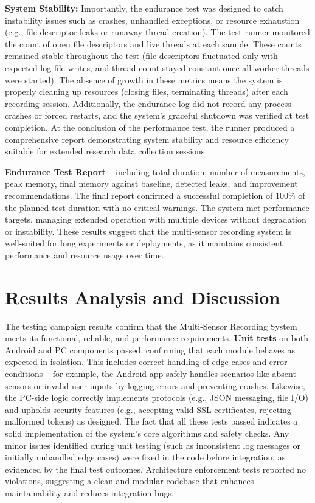 \textbf{System Stability:} Importantly, the endurance test was designed to catch instability issues such as crashes, unhandled exceptions, or resource exhaustion (e.g., file descriptor leaks or runaway thread creation). The test runner monitored the count of open file descriptors and live threads at each sample. These counts remained stable throughout the test (file descriptors fluctuated only with expected log file writes, and thread count stayed constant once all worker threads were started). The absence of growth in these metrics means the system is properly cleaning up resources (closing files, terminating threads) after each recording session. Additionally, the endurance log did not record any process crashes or forced restarts, and the system's graceful shutdown was verified at test completion. At the conclusion of the performance test, the runner produced a comprehensive report demonstrating system stability and resource efficiency suitable for extended research data collection sessions.

\textbf{Endurance Test Report} -- including total duration, number of measurements, peak memory, final memory against baseline, detected leaks, and improvement recommendations. The final report confirmed a successful completion of 100\% of the planned test duration with no critical warnings. The system met performance targets, managing extended operation with multiple devices without degradation or instability. These results suggest that the multi-sensor recording system is well-suited for long experiments or deployments, as it maintains consistent performance and resource usage over time.

\section{Results Analysis and Discussion}
The testing campaign results confirm that the Multi-Sensor Recording System meets its functional, reliable, and performance requirements. \textbf{Unit tests} on both Android and PC components passed, confirming that each module behaves as expected in isolation. This includes correct handling of edge cases and error conditions -- for example, the Android app safely handles scenarios like absent sensors or invalid user inputs by logging errors and preventing crashes. Likewise, the PC-side logic correctly implements protocols (e.g., JSON messaging, file I/O) and upholds security features (e.g., accepting valid SSL certificates, rejecting malformed tokens) as designed. The fact that all these tests passed indicates a solid implementation of the system's core algorithms and safety checks. Any minor issues identified during unit testing (such as inconsistent log messages or initially unhandled edge cases) were fixed in the code before integration, as evidenced by the final test outcomes. Architecture enforcement tests reported no violations, suggesting a clean and modular codebase that enhances maintainability and reduces integration bugs.

